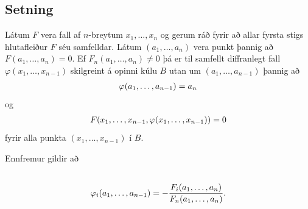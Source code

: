 \documentclass[a4paper,10pt,icelandic]{sphinxmanual}
\begin{document}
\subsection{Setning}
\label{Kafli2:id49}
Látum \(F\) vera fall af \(n\)-breytum \(x_1, \ldots,
x_n\) og gerum ráð fyrir að allar fyrsta stigs hlutafleiður \(F\) séu
samfelldar. Látum \((a_1,\ldots,a_n)\) vera punkt þannig að
\(F(a_1,\ldots,a_n)=0\). Ef \(F_n(a_1,\ldots,a_n)\neq 0\) þá er
til samfellt diffranlegt fall \(\varphi(x_1, \ldots, x_{n-1})\)
skilgreint á opinni kúlu \(B\) utan um \((a_1,\ldots,a_{n-1})\)
þannig að
\begin{gather}
\begin{split}\displaystyle \varphi(a_1,\ldots,a_{n-1})=a_n\end{split}\notag
\end{gather}
og
\begin{gather}
\begin{split}\displaystyle F(x_1,\ldots, x_{n-1}, \varphi(x_1, \ldots, x_{n-1}))=0\end{split}\notag
\end{gather}
fyrir alla punkta \((x_1, \ldots, x_{n-1})\) í \(B\).

Ennfremur gildir að
\begin{gather}
\begin{split}\displaystyle\end{split}\notag\\\begin{split}\varphi_i(a_1,\ldots,a_{n-1})
=-\frac{F_i(a_1,\ldots,a_n)}{F_n(a_1,\ldots,a_n)}.\end{split}\notag
\end{gather}
\end{document}
